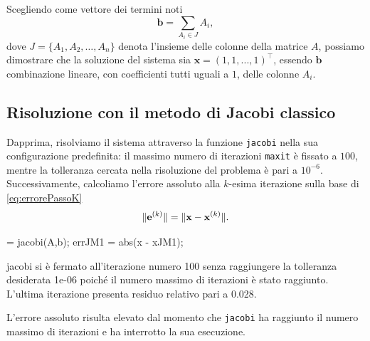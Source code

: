 Scegliendo come vettore dei termini noti
\begin{equation*}
    \mathbf{b} = \sum_ {A_{i} \in J} A_{i},
\end{equation*}
dove $J = \{A_{1}, A_{2},\dots,A_{n}\}$ denota l'insieme delle colonne della matrice $A$, possiamo dimostrare che la soluzione
del sistema sia $\mathbf{x} = (1, 1, ..., 1)^\top$, essendo $\mathbf{b}$ combinazione lineare, con coefficienti tutti uguali a $\num{1}$, delle colonne $A_{i}$.
\subsection{Risoluzione con il metodo di Jacobi classico}
Dapprima, risolviamo il sistema attraverso la funzione \lstinline{jacobi} nella sua configurazione predefinita:
il massimo numero di iterazioni \lstinline{maxit} \`e fissato a $\num{100}$, mentre la tolleranza cercata nella risoluzione del problema \`e pari a ${10}^{-6}$.\newline
    Successivamente, calcoliamo l'errore assoluto alla $k$-esima iterazione sulla base di \eqref{eq:errorePassoK}
    \begin{equation*}
        \lVert\mathbf{e}^{(k)}\rVert = \lVert\mathbf{x} - \mathbf{x}^{(k)}\rVert.
    \end{equation*}
    \begin{matlabcode}
         = jacobi(A,b);
        errJM1 = abs(x - xJM1);
    \end{matlabcode}
    \begin{matlaboutput}
        jacobi si è fermato all'iterazione numero 100 senza
        raggiungere la tolleranza desiderata 1e-06 poiché il
        numero massimo di iterazioni è stato raggiunto.
        L'ultima iterazione presenta residuo relativo
        pari a 0.028.
    \end{matlaboutput}
    L'errore assoluto risulta elevato dal momento che \lstinline{jacobi} ha raggiunto il numero massimo di iterazioni e ha interrotto la sua esecuzione.

